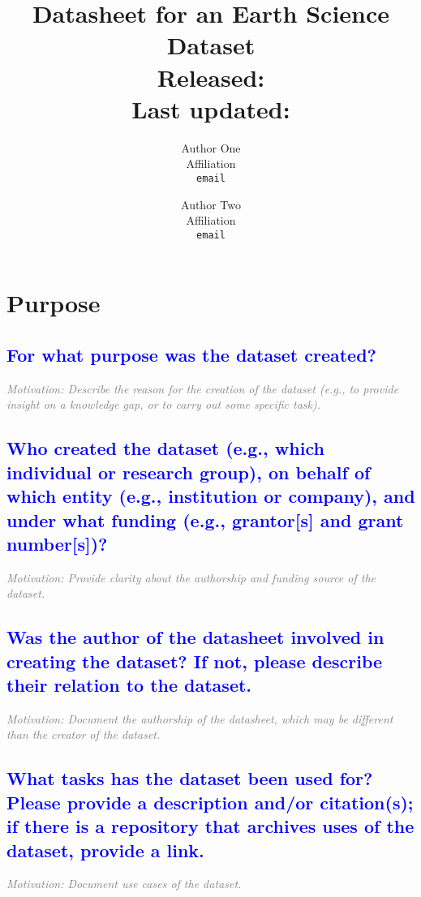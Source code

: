 \documentclass[letterpaper, 10 pt, transmag]{IEEEtran}
\title{
\LARGE \textbf{Datasheet for an Earth Science Dataset}
\\ \normalsize Released: %
\\ \footnotesize Last updated: %
}
\author{ Author One \\
	Affiliation \\
	\texttt{email} \\
	\and
	Author Two \\
	Affiliation \\
	\texttt{email} \\
}
\begin{document}
\maketitle
\thispagestyle{fancy}
\pagestyle{fancy}
\section{Purpose}

\textcolor{blue}{\subsection{For what purpose was the dataset created?}}
\textcolor{gray}{\textit{Motivation: Describe the reason for the creation of the dataset (e.g., to provide insight on a knowledge gap, or to carry out some specific task).}}

\textcolor{blue}{\subsection{Who created the dataset (e.g., which individual or research group), on behalf of which entity (e.g., institution or company), and under what funding (e.g., grantor[s] and grant number[s])?}}
\textcolor{gray}{\textit{Motivation: Provide clarity about the authorship and funding source of the dataset.}}

\textcolor{blue}{\subsection{Was the author of the datasheet involved in creating the dataset? If not, please describe their relation to the dataset.}}
\textcolor{gray}{\textit{Motivation: Document the authorship of the datasheet, which may be different than the creator of the dataset.}}

\textcolor{blue}{\subsection{What tasks has the dataset been used for? Please provide a description and/or citation(s); if there is a repository that archives uses of the dataset, provide a link.}}
\textcolor{gray}{\textit{Motivation: Document use cases of the dataset.}}
\end{document}
